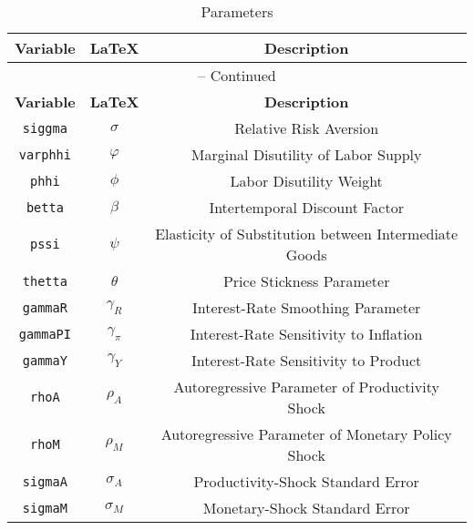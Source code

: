 \begin{center}
\begin{longtable}{ccc}
\caption{Parameters}\\%
\hline%
\multicolumn{1}{c}{\textbf{Variable}} &
\multicolumn{1}{c}{\textbf{\LaTeX}} &
\multicolumn{1}{c}{\textbf{Description}}\\%
\hline\hline%
\endfirsthead
\multicolumn{3}{c}{{\tablename} \thetable{} -- Continued}\\%
\hline%
\multicolumn{1}{c}{\textbf{Variable}} &
\multicolumn{1}{c}{\textbf{\LaTeX}} &
\multicolumn{1}{c}{\textbf{Description}}\\%
\hline\hline%
\endhead
\texttt{siggma} & ${\sigma}$ & Relative Risk Aversion\\
\texttt{varphhi} & ${\varphi}$ & Marginal Disutility of Labor Supply\\
\texttt{phhi} & ${\phi}$ & Labor Disutility Weight\\
\texttt{betta} & ${\beta}$ & Intertemporal Discount Factor\\
\texttt{pssi} & ${\psi}$ & Elasticity of Substitution between Intermediate Goods\\
\texttt{thetta} & ${\theta}$ & Price Stickness Parameter\\
\texttt{gammaR} & ${\gamma_R}$ & Interest-Rate Smoothing Parameter\\
\texttt{gammaPI} & ${\gamma_\pi}$ & Interest-Rate Sensitivity to Inflation\\
\texttt{gammaY} & ${\gamma_Y}$ & Interest-Rate Sensitivity to Product\\
\texttt{rhoA} & ${\rho_A}$ & Autoregressive Parameter of Productivity Shock\\
\texttt{rhoM} & ${\rho_M}$ & Autoregressive Parameter of Monetary Policy Shock\\
\texttt{sigmaA} & ${\sigma_A}$ & Productivity-Shock Standard Error\\
\texttt{sigmaM} & ${\sigma_M}$ & Monetary-Shock Standard Error\\
\hline%
\end{longtable}
\end{center}
